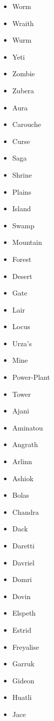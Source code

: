 \documentclass{article}
\begin{document}
\begin{multicols}{3}
\begin{itemize}
        \item Worm
        \item Wraith
        \item Wurm
        \item Yeti
        \item Zombie
        \item Zubera
        \item Aura
        \item Carouche
        \item Curse
        \item Saga
        \item Shrine
        \item Plains
        \item Island
        \item Swamp
        \item Mountain
        \item Forest
        \item Desert
        \item Gate
        \item Lair
        \item Locus
        \item Urza's
        \item Mine
        \item Power-Plant
        \item Tower
        \item Ajani
        \item Aminatou
        \item Angrath
        \item Arlinn
        \item Ashiok
        \item Bolas
        \item Chandra
        \item Dack
        \item Daretti
        \item Davriel
        \item Domri
        \item Dovin
        \item Elspeth
        \item Estrid
        \item Freyalise
        \item Garruk
        \item Gideon
        \item Huatli
        \item Jace

\end{itemize}
\end{multicols}
\end{document}
